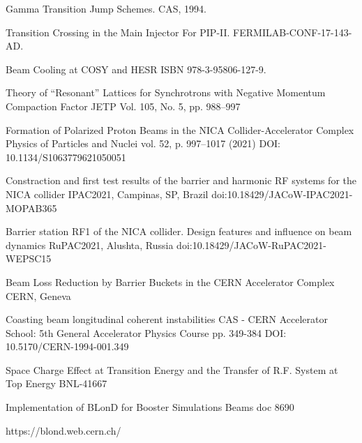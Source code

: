 \documentclass[a4paper]{panl}
\begin{document}
\begin{thebibliography}{1}
 {Gamma Transition Jump Schemes}. \BibDash
\newblock CAS, 1994.

 Transition Crossing in the Main Injector For PIP-II. \BibDash
\newblock FERMILAB-CONF-17-143-AD.

 Beam Cooling at COSY and HESR \BibDash
\newblock ISBN 978-3-95806-127-9.

 Theory of “Resonant” Lattices for Synchrotrons with Negative Momentum Compaction Factor \BibDash
\newblock JETP \BibDash
\newblock Vol. 105, No. 5, pp. 988–997 \BibDash
{}

 Formation of Polarized Proton Beams in the NICA Collider-Accelerator Complex \BibDash
\newblock Physics of Particles and Nuclei \BibDash
\newblock vol. 52, p. 997–1017 (2021) \BibDash
\newblock DOI: 10.1134/S1063779621050051

 Constraction and first test results of the barrier and harmonic RF systems for the NICA collider \BibDash
\newblock IPAC2021, Campinas, SP, Brazil \BibDash 
\newblock doi:10.18429/JACoW-IPAC2021-MOPAB365

 Barrier station RF1 of the NICA collider. Design features and influence on beam dynamics \BibDash
\newblock RuPAC2021, Alushta, Russia \BibDash 
\newblock doi:10.18429/JACoW-RuPAC2021-WEPSC15

 Beam Loss Reduction by Barrier Buckets in the CERN Accelerator Complex \BibDash
\newblock CERN, Geneva \BibDash 
{}

 Coasting beam longitudinal coherent instabilities \BibDash
\newblock CAS - CERN Accelerator School: 5th General Accelerator Physics Course \BibDash 
\newblock pp. 349-384 \BibDash 
\newblock DOI: 10.5170/CERN-1994-001.349

 Space Charge Effect at Transition Energy and the Transfer of R.F. System at Top Energy \BibDash
\newblock BNL-41667

 Implementation of BLonD for Booster Simulations
 \BibDash
\newblock  Beams doc 8690  \BibDash
{}

 https://blond.web.cern.ch/

\end{thebibliography}
\end{document}
